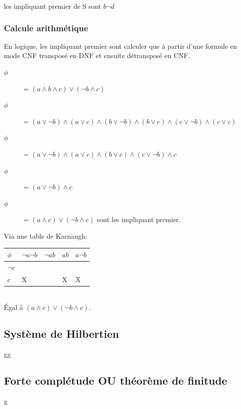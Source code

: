 les impliquant premier de S sont $b \neg d$\\

\subsubsection{Calcule arithmétique}
En logique, les impliquant premier sont calculer que à partir d'une formule en mode CNF transposé en DNF et ensuite détransposé en CNF.

\begin{description}
\item[$\phi$] = $(a \wedge b \wedge c) \vee ( \neg b \wedge c)$
\item[$\phi$] = $(a \vee \neg b) \wedge (a \vee c) \wedge ( b \vee \neg b) \wedge (b \vee c) \wedge (c \vee  \neg b ) \wedge (c \vee c)$
\item[$\phi$] = $(a \vee \neg b) \wedge (a \vee c) \wedge (b \vee c) \wedge (c \vee \neg b) \wedge c$
\item[$\phi$] = $(a \vee \neg b) \wedge c$
\item[$\phi$] = $(a \wedge c) \vee (\neg b \wedge c)$ sont les impliquant premier.
\end{description}

Via une table de Karnaugh:\\
\begin{tabular}{l|l|l|l|l}
  \hline
  $\phi$ & $\neg a \neg b$ & $\neg a b$ & $ab$ & $a \neg b$\\
  \hline
  $\neg c$ & $ $ & $ $ & $ $ & $ $ \\
  $c$ & X & $ $ & X & X \\
  \hline
\end{tabular}\\
Égal à $(a \wedge c) \vee (\neg b \wedge c)$.

\subsection{Système de Hilbertien}

gg

\subsection{Forte complétude OU théorème de finitude}

g

\pagebreak
